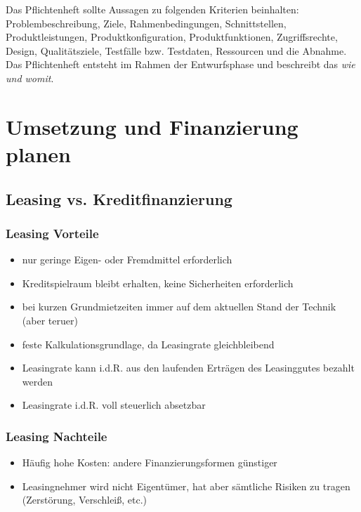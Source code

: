 \documentclass[a4paper, 12pt]{report}
\begin{document}
Das Pflichtenheft sollte Aussagen zu folgenden Kriterien beinhalten: 
Problembeschreibung, Ziele, Rahmenbedingungen, Schnittstellen, 
Produktleistungen, Produktkonfiguration, Produktfunktionen, Zugriffsrechte, 
Design, Qualitätsziele, Testfälle bzw. Testdaten, Ressourcen und die Abnahme. \\

Das Pflichtenheft entsteht im Rahmen der Entwurfsphase und beschreibt das 
\emph{wie und womit}. 

\section{Umsetzung und Finanzierung planen}
\subsection{Leasing vs. Kreditfinanzierung}

\subsubsection{Leasing Vorteile}

\begin{itemize}
    \item nur geringe Eigen- oder Fremdmittel erforderlich
    \item Kreditspielraum bleibt erhalten, keine Sicherheiten erforderlich
    \item bei kurzen Grundmietzeiten immer auf dem aktuellen Stand der Technik 
        (aber teruer)
    \item feste Kalkulationsgrundlage, da Leasingrate gleichbleibend
    \item Leasingrate kann i.d.R. aus den laufenden Erträgen des Leasinggutes 
        bezahlt werden
    \item Leasingrate i.d.R. voll steuerlich absetzbar
\end{itemize}

\subsubsection{Leasing Nachteile}
\begin{itemize}
    \item Häufig hohe Kosten: andere Finanzierungsformen günstiger
    \item Leasingnehmer wird nicht Eigentümer, hat aber sämtliche Risiken zu 
    tragen (Zerstörung, Verschleiß, etc.)
\end{itemize}
\end{document}
